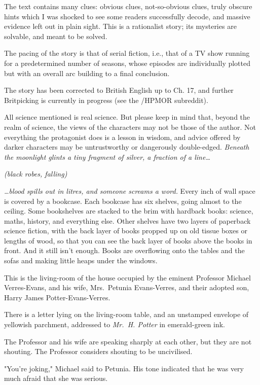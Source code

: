 The text contains many clues: obvious clues, not-so-obvious clues, truly 
obscure hints which I was shocked to see some readers successfully decode, and 
massive evidence left out in plain sight. This is a rationalist story; its 
mysteries are solvable, and meant to be solved.

The pacing of the story is that of serial fiction, i.e., that of a TV show 
running for a predetermined number of seasons, whose episodes are individually 
plotted but with an overall arc building to a final conclusion.

The story has been corrected to British English up to Ch. 17, and further 
Britpicking is currently in progress (see the /HPMOR subreddit).

All science mentioned is real science. But please keep in mind that, beyond the 
realm of science, the views of the characters may not be those of the author. 
Not everything the protagonist does is a lesson in wisdom, and advice offered 
by darker characters may be untrustworthy or dangerously double-edged.
\sbreak
\emph{Beneath the moonlight glints a tiny fragment of silver, a fraction of a 
line{\ldots}}

\emph{(black robes, falling)}

\emph{{\ldots}blood spills out in litres, and someone screams a word.}
\sbreak
Every inch of wall space is covered by a bookcase. Each bookcase has six 
shelves, going almost to the ceiling. Some bookshelves are stacked to the brim 
with hardback books: science, maths, history, and everything else. Other 
shelves have two layers of paperback science fiction, with the back layer of 
books propped up on old tissue boxes or lengths of wood, so that you can see 
the back layer of books above the books in front. And it still isn't enough. 
Books are overflowing onto the tables and the sofas and making little heaps 
under the windows.

This is the living-room of the house occupied by the eminent Professor Michael 
Verres-Evans, and his wife, Mrs.~Petunia Evans-Verres, and their adopted son, 
Harry James Potter-Evans-Verres.

There is a letter lying on the living-room table, and an unstamped envelope of 
yellowish parchment, addressed to \emph{Mr.~H. Potter} in emerald-green ink.

The Professor and his wife are speaking sharply at each other, but they are not 
shouting. The Professor considers shouting to be uncivilised.

"You're joking," Michael said to Petunia. His tone indicated that he was very 
much afraid that she was serious.


